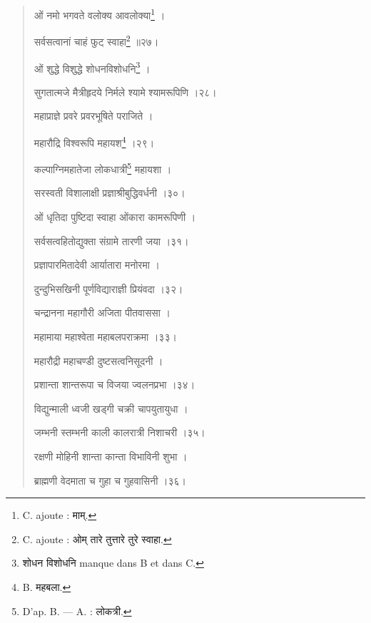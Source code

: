 \documentclass[a4paper, 11pt, oneside, french, landscape, twocolumn]{article}
\begin{document}
\begin{quotation}
\bigskip

\texthindi{ओं नमो भगवते वलोक्य आवलोक्या}\footnote{C. ajoute : \texthindi{माम्}.} \texthindi{।}

\texthindi{सर्वसत्वानां चाहं फुट् स्वाहा}\footnote{C. ajoute : \texthindi{ओम् तारे तुत्तारे तुरे स्वाहा}.} \texthindi{॥२७।}

\bigskip

\texthindi{ओं शुद्धे विशुद्धे शोधनविशोधनि}\footnote{\texthindi{शोधन विशोधनि} manque dans B et dans C.} \texthindi{।}

\texthindi{सुगतात्मजे मैत्रीहृदये निर्मले श्यामे श्यामरूपिणि ।२८।}

\bigskip

\texthindi{महाप्राज्ञे प्रवरे प्रवरभूषिते पराजिते ।}

\texthindi{महारौद्रि विश्वरूपि महायश}\footnote{B. \texthindi{महबला.}} \texthindi{।२९।}

\bigskip

\texthindi{कल्पाग्निमहातेजा लोकधात्री}\footnote{D'ap. B. --- A. : \texthindi{लोकत्री}.} \texthindi{महायशा ।}

\texthindi{सरस्वती विशालाक्षी प्रज्ञाश्रीबुद्धिवर्धनी ।३०।}

\bigskip

\texthindi{ओं धृतिदा पुष्टिदा स्वाहा ओंकारा कामरूपिणी ।}

\texthindi{सर्वसत्वहितोद्युक्ता संग्रामे तारणी जया ।३१।}

\bigskip

\texthindi{प्रज्ञापारमितादेवी आर्यातारा मनोरमा ।}

\texthindi{दुन्दुभिसखिनी पूर्णविद्याराज्ञी प्रियंवदा ।३२।}

\bigskip

\texthindi{चन्द्रानना महागौरी अजिता पीतवाससा ।}

\texthindi{महामाया महाश्वेता महाबलपराक्रमा ।३३।}

\bigskip

\texthindi{महारौद्री महाचण्डी दुष्टसत्वनिसूदनी ।}

\texthindi{प्रशान्ता शान्तरूपा च विजया ज्वलनप्रभा ।३४।}

\bigskip

\texthindi{विद्युन्माली ध्वजी खड्गी चक्री चापयुतायुधा ।}

\texthindi{जम्भनी स्तम्भनी काली कालरात्री निशाचरी ।३५।}

\bigskip

\texthindi{रक्षणी मोहिनी शान्ता कान्ता विभाविनी शुभा ।}

\texthindi{ब्राह्मणी वेदमाता च गुहा च गुहवासिनी ।३६।}


\end{quotation}
\end{document}
